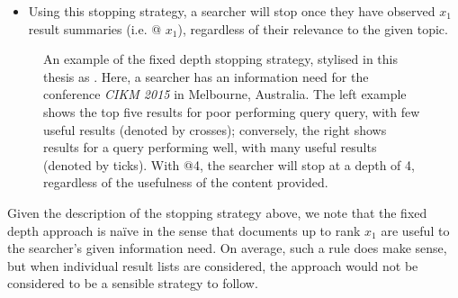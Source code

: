 \begin{itemize}
    
    \item[]{} Using this stopping strategy, a searcher will stop once they have observed $x_1$ result summaries (i.e.  @ $x_1$), regardless of their relevance to the given topic.
    
\end{itemize}

\begin{figure}[t!]
    \centering
    \caption[Examples of the fixed depth stopping strategy, ]{An example of the fixed depth stopping strategy, stylised in this thesis as . Here, a searcher has an information need for the conference \emph{CIKM 2015} in Melbourne, Australia. The left example shows the top five results for poor performing query query, with few useful results (denoted by {\color{dmax_red}crosses}); conversely, the right shows results for a query performing well, with many useful results (denoted by {\color{dmax_green}ticks}). With  @4, the searcher will stop at a depth of 4, regardless of the usefulness of the content provided.}
    \label{fig:ss1}
\end{figure}

Given the description of the stopping strategy above, we note that the fixed depth approach is na\"{i}ve in the sense that documents up to rank $x_1$ are useful to the searcher's given information need. On average, such a rule does make sense, but when individual result lists are considered, the approach would not be considered to be a sensible strategy to follow.

